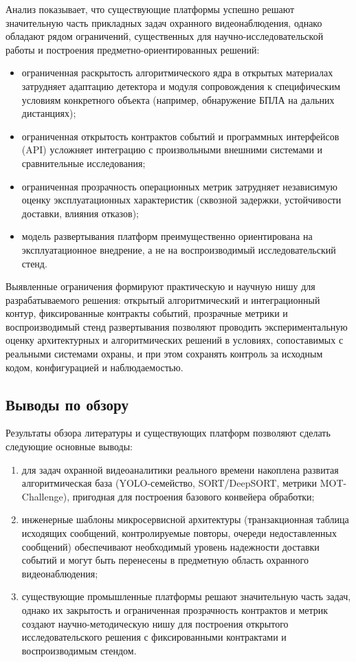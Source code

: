 Анализ показывает, что существующие платформы успешно решают значительную часть прикладных задач охранного видеонаблюдения, однако обладают рядом ограничений, существенных для научно-исследовательской работы и построения предметно-ориентированных решений:
\begin{itemize}
    \item ограниченная раскрытость алгоритмического ядра в открытых материалах затрудняет адаптацию детектора и модуля сопровождения к специфическим условиям конкретного объекта (например, обнаружение БПЛА на дальних дистанциях);
    \item ограниченная открытость контрактов событий и программных интерфейсов (API) усложняет интеграцию с произвольными внешними системами и сравнительные исследования;
    \item ограниченная прозрачность операционных метрик затрудняет независимую оценку эксплуатационных характеристик (сквозной задержки, устойчивости доставки, влияния отказов);
    \item модель развертывания платформ преимущественно ориентирована на эксплуатационное внедрение, а не на воспроизводимый исследовательский стенд.
\end{itemize}

Выявленные ограничения формируют практическую и научную нишу для разрабатываемого решения: открытый алгоритмический и интеграционный контур, фиксированные контракты событий, прозрачные метрики и воспроизводимый стенд развертывания позволяют проводить экспериментальную оценку архитектурных и алгоритмических решений в условиях, сопоставимых с реальными системами охраны, и при этом сохранять контроль за исходным кодом, конфигурацией и наблюдаемостью.

\subsection{Выводы по обзору}

Результаты обзора литературы и существующих платформ позволяют сделать следующие основные выводы:
\begin{enumerate}
    \item для задач охранной видеоаналитики реального времени накоплена развитая алгоритмическая база (YOLO-семейство, SORT/DeepSORT, метрики MOT-Challenge), пригодная для построения базового конвейера обработки;
    \item инженерные шаблоны микросервисной архитектуры (транзакционная таблица исходящих сообщений, контролируемые повторы, очереди недоставленных сообщений) обеспечивают необходимый уровень надежности доставки событий и могут быть перенесены в предметную область охранного видеонаблюдения;
    \item существующие промышленные платформы решают значительную часть задач, однако их закрытость и ограниченная прозрачность контрактов и метрик создают научно-методическую нишу для построения открытого исследовательского решения с фиксированными контрактами и воспроизводимым стендом.
\end{enumerate}


